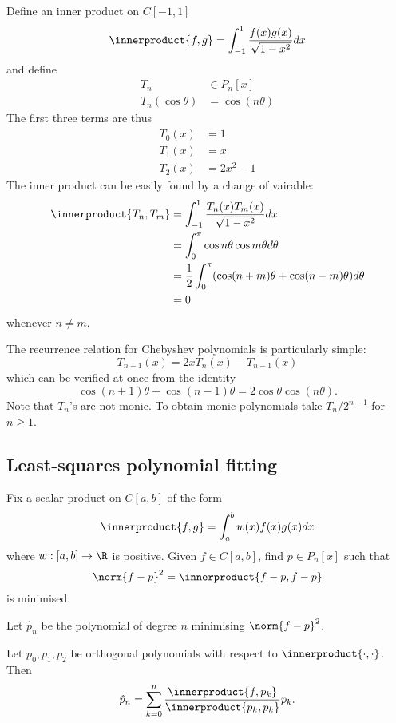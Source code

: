 \documentclass[a4paper]{article}
\newcommand*{\inner}{\innerproduct}
\begin{document}
\begin{eg}
  Define an inner product on \(C[-1, 1]\)
  \[
    \inner{f, g} = \int_{-1}^1 \frac{f(x)g(x)}{\sqrt{1 - x^2}} dx
  \]
  and define
  \begin{align*}
    T_n &\in P_n[x] \\
    T_n(\cos\theta) &= \cos(n\theta)
  \end{align*}
  The first three terms are thus
  \begin{align*}
    T_0(x) &= 1 \\
    T_1(x) &= x \\
    T_2(x) &= 2x^2 - 1
  \end{align*}
  The inner product can be easily found by a change of vairable:
  \begin{align*}
    \inner{T_n, T_m}
    &= \int_{-1}^1 \frac{T_n(x)T_m(x)}{\sqrt{1 - x^2}} dx \\
    &= \int_0^\pi \cos n\theta \cos m\theta d\theta \\
    &= \frac{1}{2} \int_0^\pi (\cos (n + m)\theta + \cos (n - m)\theta) d\theta \\
    &= 0
  \end{align*}
  whenever \(n \neq m\).

  The recurrence relation for Chebyshev polynomials is particularly simple:
  \[
    T_{n + 1}(x) = 2xT_n(x) - T_{n - 1}(x)
  \]
  which can be verified at once from the identity
  \[
    \cos(n + 1)\theta + \cos(n - 1)\theta = 2\cos \theta \cos (n\theta).
  \]
  Note that \(T_n\)'s are not monic. To obtain monic polynomials take \(T_n/2^{n - 1}\) for \(n \geq 1\).
\end{eg}


\subsection{Least-squares polynomial fitting}

\begin{question}
Fix a scalar product on \(C[a, b]\) of the form
\[
  \inner{f, g} = \int_a^b w(x)f(x)g(x) dx
\]
where \(w: [a, b] \to \R\) is positive. Given \(f \in C[a, b]\), find \(p \in P_n[x]\) such that
  \[
    \norm{f - p}^2 = \inner{f - p, f - p}
  \]
  is minimised.
\end{question}

Let \(\hat p_n\) be the polynomial of degree \(n\) minimising \(\norm{f - p}^2\).

\begin{theorem}
  Let \(p_0, p_1, p_2\) be orthogonal polynomials with respect to \(\inner{\cdot, \cdot}\). Then
  \[
    \hat p_n = \sum_{k = 0}^n \frac{\inner{f, p_k}}{\inner{p_k, p_k}} p_k.
  \]
\end{theorem}
\end{document}
